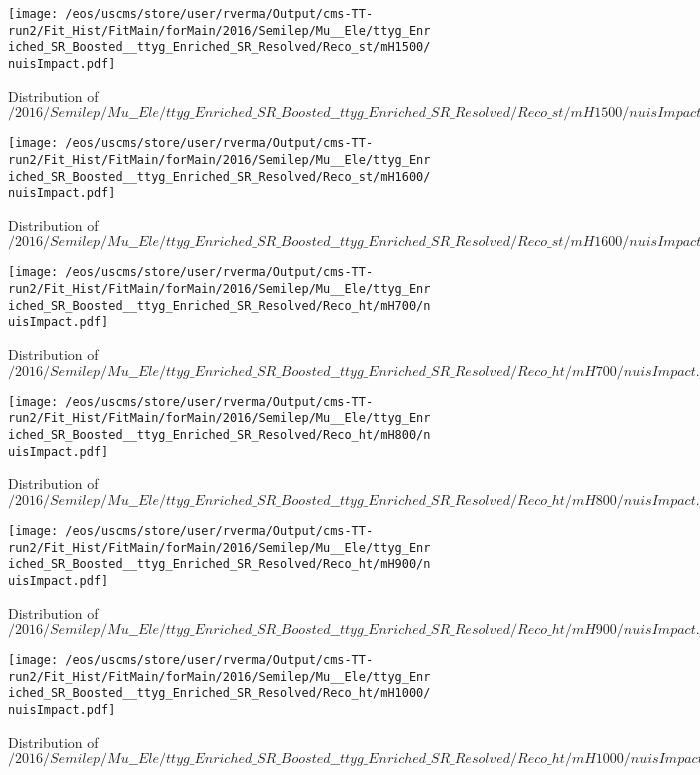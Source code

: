 \begin{figure}
\centering
\texttt{[image: /eos/uscms/store/user/rverma/Output/cms-TT-run2/Fit\_Hist/FitMain/forMain/2016/Semilep/Mu\_\_Ele/ttyg\_Enriched\_SR\_Boosted\_\_ttyg\_Enriched\_SR\_Resolved/Reco\_st/mH1500/nuisImpact.pdf]}
\caption{Distribution of $/2016/Semilep/Mu\_\_Ele/ttyg\_Enriched\_SR\_Boosted\_\_ttyg\_Enriched\_SR\_Resolved/Reco\_st/mH1500/nuisImpact.pdf$}
\end{figure}

\begin{figure}
\centering
\texttt{[image: /eos/uscms/store/user/rverma/Output/cms-TT-run2/Fit\_Hist/FitMain/forMain/2016/Semilep/Mu\_\_Ele/ttyg\_Enriched\_SR\_Boosted\_\_ttyg\_Enriched\_SR\_Resolved/Reco\_st/mH1600/nuisImpact.pdf]}
\caption{Distribution of $/2016/Semilep/Mu\_\_Ele/ttyg\_Enriched\_SR\_Boosted\_\_ttyg\_Enriched\_SR\_Resolved/Reco\_st/mH1600/nuisImpact.pdf$}
\end{figure}

\begin{figure}
\centering
\texttt{[image: /eos/uscms/store/user/rverma/Output/cms-TT-run2/Fit\_Hist/FitMain/forMain/2016/Semilep/Mu\_\_Ele/ttyg\_Enriched\_SR\_Boosted\_\_ttyg\_Enriched\_SR\_Resolved/Reco\_ht/mH700/nuisImpact.pdf]}
\caption{Distribution of $/2016/Semilep/Mu\_\_Ele/ttyg\_Enriched\_SR\_Boosted\_\_ttyg\_Enriched\_SR\_Resolved/Reco\_ht/mH700/nuisImpact.pdf$}
\end{figure}

\begin{figure}
\centering
\texttt{[image: /eos/uscms/store/user/rverma/Output/cms-TT-run2/Fit\_Hist/FitMain/forMain/2016/Semilep/Mu\_\_Ele/ttyg\_Enriched\_SR\_Boosted\_\_ttyg\_Enriched\_SR\_Resolved/Reco\_ht/mH800/nuisImpact.pdf]}
\caption{Distribution of $/2016/Semilep/Mu\_\_Ele/ttyg\_Enriched\_SR\_Boosted\_\_ttyg\_Enriched\_SR\_Resolved/Reco\_ht/mH800/nuisImpact.pdf$}
\end{figure}

\begin{figure}
\centering
\texttt{[image: /eos/uscms/store/user/rverma/Output/cms-TT-run2/Fit\_Hist/FitMain/forMain/2016/Semilep/Mu\_\_Ele/ttyg\_Enriched\_SR\_Boosted\_\_ttyg\_Enriched\_SR\_Resolved/Reco\_ht/mH900/nuisImpact.pdf]}
\caption{Distribution of $/2016/Semilep/Mu\_\_Ele/ttyg\_Enriched\_SR\_Boosted\_\_ttyg\_Enriched\_SR\_Resolved/Reco\_ht/mH900/nuisImpact.pdf$}
\end{figure}

\begin{figure}
\centering
\texttt{[image: /eos/uscms/store/user/rverma/Output/cms-TT-run2/Fit\_Hist/FitMain/forMain/2016/Semilep/Mu\_\_Ele/ttyg\_Enriched\_SR\_Boosted\_\_ttyg\_Enriched\_SR\_Resolved/Reco\_ht/mH1000/nuisImpact.pdf]}
\caption{Distribution of $/2016/Semilep/Mu\_\_Ele/ttyg\_Enriched\_SR\_Boosted\_\_ttyg\_Enriched\_SR\_Resolved/Reco\_ht/mH1000/nuisImpact.pdf$}
\end{figure}

